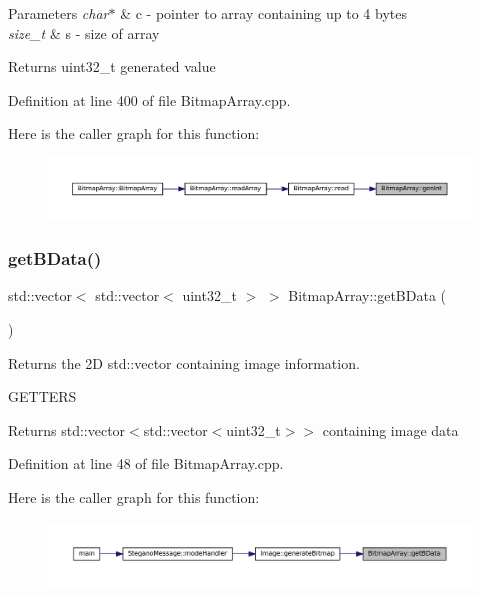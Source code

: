 \begin{DoxyParams}{Parameters}
{\em char$\ast$} & c -\/ pointer to array containing up to 4 bytes \\
\hline
{\em size\+\_\+t} & s -\/ size of array \\
\hline
\end{DoxyParams}
\begin{DoxyReturn}{Returns}
uint32\+\_\+t generated value 
\end{DoxyReturn}


Definition at line 400 of file Bitmap\+Array.\+cpp.

Here is the caller graph for this function\+:\nopagebreak
\begin{figure}[H]
\begin{center}
\leavevmode
\includegraphics[width=350pt]{classBitmapArray_a158fbbaa026332a732f644a8c368a2f0_icgraph}
\end{center}
\end{figure}
\mbox{\label{classBitmapArray_a66bd389c357de601df924569a0b38429}} 
\subsubsection{\texorpdfstring{getBData()}{getBData()}}
{\footnotesize\ttfamily std\+::vector$<$ std\+::vector$<$ uint32\+\_\+t $>$ $>$ Bitmap\+Array\+::get\+B\+Data (\begin{DoxyParamCaption}{ }\end{DoxyParamCaption})}



Returns the 2D std\+::vector containing image information. 

G\+E\+T\+T\+E\+RS\begin{DoxyReturn}{Returns}
std\+::vector$<$std\+::vector$<$uint32\+\_\+t$>$$>$ containing image data 
\end{DoxyReturn}


Definition at line 48 of file Bitmap\+Array.\+cpp.

Here is the caller graph for this function\+:\nopagebreak
\begin{figure}[H]
\begin{center}
\leavevmode
\includegraphics[width=350pt]{classBitmapArray_a66bd389c357de601df924569a0b38429_icgraph}
\end{center}
\end{figure}
\mbox{\label{classBitmapArray_ab914d6282460b386b2b5f936190487a2}} 

